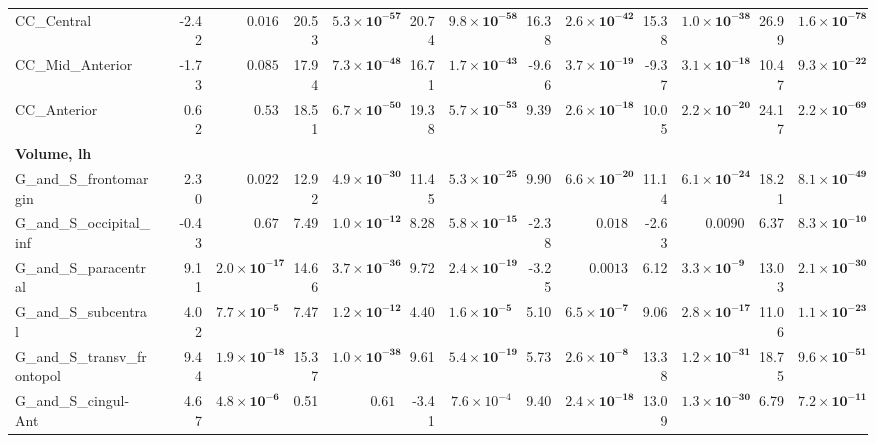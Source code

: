 {\begin{longtable}{llrrrrrrrrrrrr}
CC\_Central &  & -2.42 & $0.016$ & 20.53 & $\mathbf{5.3{\times}10^{-57}}$ & 20.74 & $\mathbf{9.8{\times}10^{-58}}$ & 16.38 & $\mathbf{2.6{\times}10^{-42}}$ & 15.38 & $\mathbf{1.0{\times}10^{-38}}$ & 26.99 & $\mathbf{1.6{\times}10^{-78}}$ \\
CC\_Mid\_Anterior &  & -1.73 & $0.085$ & 17.94 & $\mathbf{7.3{\times}10^{-48}}$ & 16.71 & $\mathbf{1.7{\times}10^{-43}}$ & -9.66 & $\mathbf{3.7{\times}10^{-19}}$ & -9.37 & $\mathbf{3.1{\times}10^{-18}}$ & 10.47 & $\mathbf{9.3{\times}10^{-22}}$ \\
CC\_Anterior &  & 0.62 & $0.53$ & 18.51 & $\mathbf{6.7{\times}10^{-50}}$ & 19.38 & $\mathbf{5.7{\times}10^{-53}}$ & 9.39 & $\mathbf{2.6{\times}10^{-18}}$ & 10.05 & $\mathbf{2.2{\times}10^{-20}}$ & 24.17 & $\mathbf{2.2{\times}10^{-69}}$ \\
\midrule\multicolumn{14}{l}{\textbf{Volume, lh}} \\
G\_and\_S\_frontomargin &  & 2.30 & $0.022$ & 12.92 & $\mathbf{4.9{\times}10^{-30}}$ & 11.45 & $\mathbf{5.3{\times}10^{-25}}$ & 9.90 & $\mathbf{6.6{\times}10^{-20}}$ & 11.14 & $\mathbf{6.1{\times}10^{-24}}$ & 18.21 & $\mathbf{8.1{\times}10^{-49}}$ \\
G\_and\_S\_occipital\_inf &  & -0.43 & $0.67$ & 7.49 & $\mathbf{1.0{\times}10^{-12}}$ & 8.28 & $\mathbf{5.8{\times}10^{-15}}$ & -2.38 & $0.018$ & -2.63 & $0.0090$ & 6.37 & $\mathbf{8.3{\times}10^{-10}}$ \\
G\_and\_S\_paracentral &  & 9.11 & $\mathbf{2.0{\times}10^{-17}}$ & 14.66 & $\mathbf{3.7{\times}10^{-36}}$ & 9.72 & $\mathbf{2.4{\times}10^{-19}}$ & -3.25 & $0.0013$ & 6.12 & $\mathbf{3.3{\times}10^{-9}}$ & 13.03 & $\mathbf{2.1{\times}10^{-30}}$ \\
G\_and\_S\_subcentral &  & 4.02 & $\mathbf{7.7{\times}10^{-5}}$ & 7.47 & $\mathbf{1.2{\times}10^{-12}}$ & 4.40 & $\mathbf{1.6{\times}10^{-5}}$ & 5.10 & $\mathbf{6.5{\times}10^{-7}}$ & 9.06 & $\mathbf{2.8{\times}10^{-17}}$ & 11.06 & $\mathbf{1.1{\times}10^{-23}}$ \\
G\_and\_S\_transv\_frontopol &  & 9.44 & $\mathbf{1.9{\times}10^{-18}}$ & 15.37 & $\mathbf{1.0{\times}10^{-38}}$ & 9.61 & $\mathbf{5.4{\times}10^{-19}}$ & 5.73 & $\mathbf{2.6{\times}10^{-8}}$ & 13.38 & $\mathbf{1.2{\times}10^{-31}}$ & 18.75 & $\mathbf{9.6{\times}10^{-51}}$ \\
G\_and\_S\_cingul-Ant &  & 4.67 & $\mathbf{4.8{\times}10^{-6}}$ & 0.51 & $0.61$ & -3.41 & $7.6{\times}10^{-4}$ & 9.40 & $\mathbf{2.4{\times}10^{-18}}$ & 13.09 & $\mathbf{1.3{\times}10^{-30}}$ & 6.79 & $\mathbf{7.2{\times}10^{-11}}$ \\

\end{longtable}}
